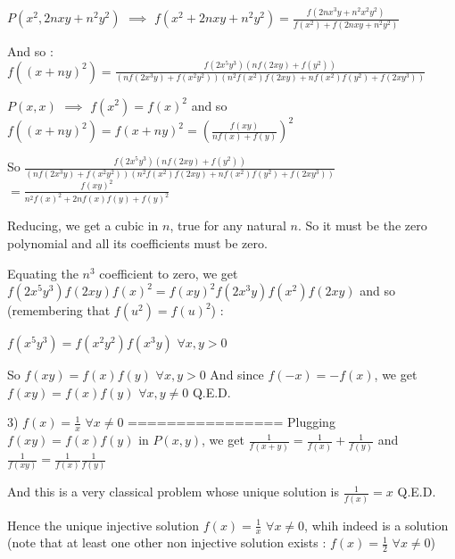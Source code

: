 \begin{solution}
$P(x^2,2nxy+n^2y^2)$ $\implies$ $f(x^2+2nxy+n^2y^2)=\frac{f(2nx^3y+n^2x^2y^2)}{f(x^2)+f(2nxy+n^2y^2)}$

And so :
$f((x+ny)^2)=\frac{f(2x^5y^3)(nf(2xy)+f(y^2))}{(nf(2x^3y)+f(x^2y^2))(n^2f(x^2)f(2xy)+nf(x^2)f(y^2)+f(2xy^3))}$

$P(x,x)$ $\implies$ $f(x^2)=f(x)^2$ and so $f((x+ny)^2)=f(x+ny)^2=\left(\frac{f(xy)}{nf(x)+f(y)}\right)^2$

So $\frac{f(2x^5y^3)(nf(2xy)+f(y^2))}{(nf(2x^3y)+f(x^2y^2))(n^2f(x^2)f(2xy)+nf(x^2)f(y^2)+f(2xy^3))}$ $=\frac{f(xy)^2}{n^2f(x)^2+2nf(x)f(y)+f(y)^2}$

Reducing, we get a cubic in $n$, true for any natural $n$. So it must be the zero polynomial and all its coefficients must be zero.

Equating the $n^3$ coefficient to zero, we get $f(2x^5y^3)f(2xy)f(x)^2=f(xy)^2f(2x^3y)f(x^2)f(2xy)$ and so (remembering that $f(u^2)=f(u)^2$) :

$f(x^5y^3)=f(x^2y^2)f(x^3y)$ $\forall x,y>0$

So $f(xy)=f(x)f(y)$ $\forall x,y>0$
And since $f(-x)=-f(x)$, we get $f(xy)=f(x)f(y)$ $\forall x,y\ne 0$
Q.E.D.

3) $f(x)=\frac 1x$ $\forall x\ne 0$
================
Plugging $f(xy)=f(x)f(y)$ in $P(x,y)$, we get $\frac 1{f(x+y)}=\frac 1{f(x)}+\frac 1{f(y)}$ and $\frac 1{f(xy)}=\frac 1{f(x)}\frac 1{f(y)}$

And this is a very classical problem whose unique solution is $\frac 1{f(x)}=x$
Q.E.D.

Hence the unique injective solution $\boxed{f(x)=\frac 1x}$ $\forall x\ne 0$, whih indeed is a solution
(note that at least one other non injective solution exists : $f(x)=\frac 12$ $\forall x\ne 0$)
\end{solution}



